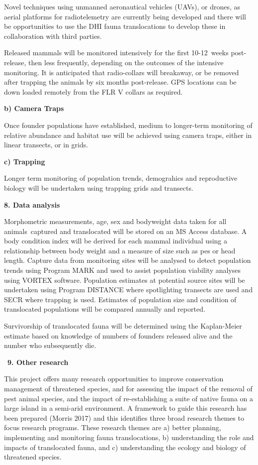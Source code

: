 \documentclass[version=last,
    paper=a4,                               %
    10pt,                                   %
    dvipsnames,
    oneside,                              %
    headings=openany,                       %
    open=any,
    BCOR=7mm,                               %
    DIV=15,     %
]{scrbook}
\begin{document}
Novel techniques using unmanned aeronautical vehicles (UAVs), or drones,
as aerial platforms for radiotelemetry are currently being developed and
there will be opportunities to use the DHI fauna translocations to
develop these in collaboration with third parties.

Released mammals will be monitored intensively for the first 10-12~weeks
post-release, then less frequently, depending on the outcomes of the
intensive monitoring. It is anticipated that radio-collars will
breakaway, or be removed after trapping the animals by six months
post-release. GPS locations can be down loaded remotely from the FLR V
collars as required.

\textbf{b) Camera Traps}

Once founder populations have established, medium to longer-term
monitoring of relative abundance and habitat use will be achieved using
camera traps, either in linear transects, or in grids.~

\textbf{c) Trapping}

Longer term monitoring of population trends, demograhics and
reproductive biology will be undertaken using trapping grids and
transects.~

\textbf{8. Data analysis}

Morphometric measurements, age, sex and bodyweight data taken for all
animals~captured and translocated will be stored on an MS Access
database. A body condition index will be derived for each mammal
individual using a relationship between body weight and a measure of
size such as pes or head length. Capture data from monitoring sites will
be analysed to detect population trends using Program MARK and used to
assist population viability analyses using VORTEX software. Population
estimates at potential source sites will be undertaken using Program
DISTANCE where spotlighting transects are used and SECR where trapping
is used. Estimates of population size and condition of translocated
populations will be compared annually and reported.

Survivorship of translocated fauna will be determined using the
Kaplan-Meier estimate based on knowledge of numbers of founders released
alive and the number who subsequently die.

~\textbf{9. Other research}

This project offers many research opportunities to improve conservation
management of threatened species, and for assessing the impact of the
removal of pest animal species, and the impact of re-establishing a
suite of native fauna on a large island in a semi-arid environment. A
framework to guide this research has been prepared (Morris 2017) and
this identifies three broad research themes to focus research programs.
These research themes are a) better planning, implementing and
monitoring fauna translocations, b) understanding the role and impacts
of translocated fauna, and c) understanding the ecology and biology of
threatened species.~
\end{document}
